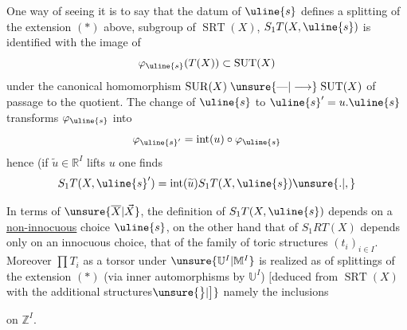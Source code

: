
One way of seeing it is to say that
the datum of $\uline{s}$ defines a splitting
 of
the extension $(*)$ above, 
subgroup of $\operatorname{SRT}(X)$,
$S_1T(X,\uline{s})$ is identified
with the  image of
\[
\varphi_{\uline{s}}(T(X))\subset\operatorname{SUT}(X)
\]
under the canonical homomorphism
$\operatorname{SUR}(X)\mathrel{\unsure{\text{---}|\longrightarrow}}\operatorname{SUT}(X)$
of passage to the quotient. The change of
$\uline{s}$ to $\uline{s}'=u.\uline{s}$
transforms $\varphi_{\uline{s}}$ into
\[
\varphi_{\uline{s}'}=\operatorname{int}(u)\circ\varphi_{\uline{s}}
\]
hence (if $\widetilde u\in\mathbb R^I$ lifts $u$\unsure{,|)} one finds
\[
S_1T(X,\uline{s}')
=\operatorname{int}(\widetilde u)S_1T(X,\uline{s})\unsure{.|,}
\]

In terms of $\unsure{\overline X|\vec X}$, the definition of
$S_1T(X,\uline{s})$
depends on a \uline{non-innocuous} choice $\uline{s}$,
on the other hand that of $S_1RT(X)$ depends only on
an innocuous choice, that of the family of
toric structures $(t_i)_{i\in I}$.
Moreover $\prod T_i$ as
a torsor under $\unsure{\mathbb U^I|\mathbb M^I}$ is realized
as  of splittings of the extension $(*)$
(via inner automorphisms by $\mathbb U^I$)
$\bigl[$deduced from $\operatorname{SRT}(X)$
with the additional structures$\unsure{\bigr\}|\bigr]}$
namely\unsure{)|,} the inclusions


 on $\mathbb Z^I$.

